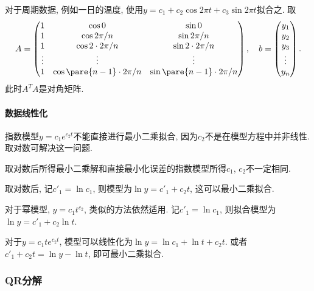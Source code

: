 \documentclass{ctexart}
\begin{document}
对于周期数据, 例如一日的温度, 使用$y = c_1 + c_2\cos 2\pi t + c_3\sin 2\pi t$拟合之. 取
\[ A = \begin{pmatrix}
    1 & \cos 0 & \sin 0 \\
    1 & \cos 2\pi/n & \sin 2\pi/n \\
    1 & \cos 2\cdot 2\pi/n & \sin 2\cdot 2\pi/n \\
    \vdots & \vdots & \vdots \\
    1 & \cos \pare{n-1}\cdot 2\pi/n & \sin \pare{n-1}\cdot 2\pi/n
\end{pmatrix},\quad b = \begin{pmatrix}
    y_1 \\ y_2 \\ y_3 \\ \vdots \\ y_n
\end{pmatrix}. \]
此时$A^TA$是对角矩阵.


\paragraph{数据线性化} %
\label{par:数据线性化}

指数模型$y=c_1e^{c_2t}$不能直接进行最小二乘拟合, 因为$c_2$不是在模型方程中并非线性. 取对数可解决这一问题.
\begin{remark}
    取对数后所得最小二乘解和直接最小化误差的指数模型所得$c_1$, $c_2$不一定相同.
\end{remark}
取对数后, 记$c'_1 = \ln c_1$, 则模型为$\ln y = c'_1 + c_2t$, 这可以最小二乘拟合.
\par
对于幂模型, $y = c_1t^{c_2}$, 类似的方法依然适用. 记$c'_1 = \ln c_1$, 则拟合模型为$\ln y = c'_1 + c_2\ln t$.
\par
对于$y=c_1te^{c_2 t}$, 模型可以线性化为$\ln y = \ln c_1 + \ln t + c_2 t$. 或者$c'_1 + c_2 t = \ln y - \ln t$, 即可最小二乘拟合.



\subsubsection{QR分解} %
\label{ssub:qr分解}
\end{document}
